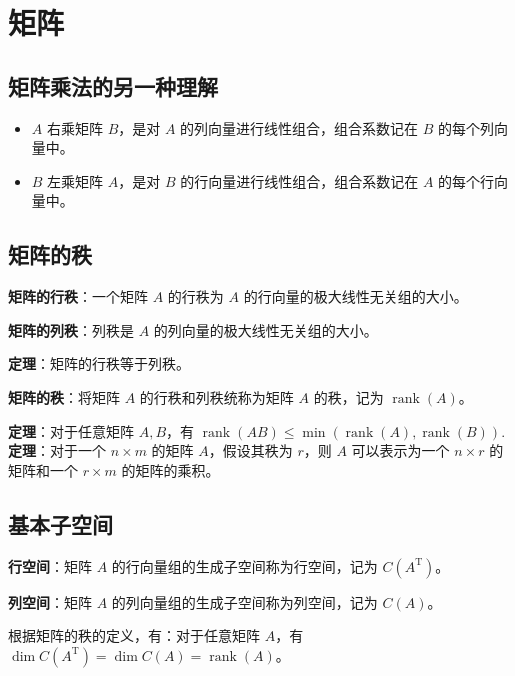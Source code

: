 \section{矩阵}

\subsection{矩阵乘法的另一种理解}

\begin{itemize}
    \item $A$ 右乘矩阵 $B$，是对 $A$ 的列向量进行线性组合，组合系数记在 $B$ 的每个列向量中。
    \item $B$ 左乘矩阵 $A$，是对 $B$ 的行向量进行线性组合，组合系数记在 $A$ 的每个行向量中。
\end{itemize}

\subsection{矩阵的秩}

\begin{tcolorbox}
    \textbf{矩阵的行秩}：一个矩阵 $A$ 的行秩为 $A$ 的行向量的极大线性无关组的大小。

    \textbf{矩阵的列秩}：列秩是 $A$ 的列向量的极大线性无关组的大小。
\end{tcolorbox}

\begin{tcolorbox}
    \textbf{定理}：矩阵的行秩等于列秩。
\end{tcolorbox}

\begin{tcolorbox}
    \textbf{矩阵的秩}：将矩阵 $A$ 的行秩和列秩统称为矩阵 $A$ 的秩，记为 $\operatorname{rank}(A)$。
\end{tcolorbox}

\begin{tcolorbox}
    \textbf{定理}：对于任意矩阵 $A,B$，有 $\operatorname{rank}(AB)\le \min(\operatorname{rank}(A),\operatorname{rank}(B))$.
    \textbf{定理}：对于一个 $n\times m$ 的矩阵 $A$，假设其秩为 $r$，则 $A$ 可以表示为一个 $n\times r$ 的矩阵和一个 $r\times m$ 的矩阵的乘积。
\end{tcolorbox}


\subsection{基本子空间}

\begin{tcolorbox}
    \textbf{行空间}：矩阵 $A$ 的行向量组的生成子空间称为行空间，记为 $C(A^{\mathrm{T}})$。

    \textbf{列空间}：矩阵 $A$ 的列向量组的生成子空间称为列空间，记为 $C(A)$。
\end{tcolorbox}
\begin{tcolorbox}
    根据矩阵的秩的定义，有：对于任意矩阵 $A$，有 $\dim C(A^{\mathrm{T}})=\dim C(A)=\operatorname{rank}(A)$。
\end{tcolorbox}

